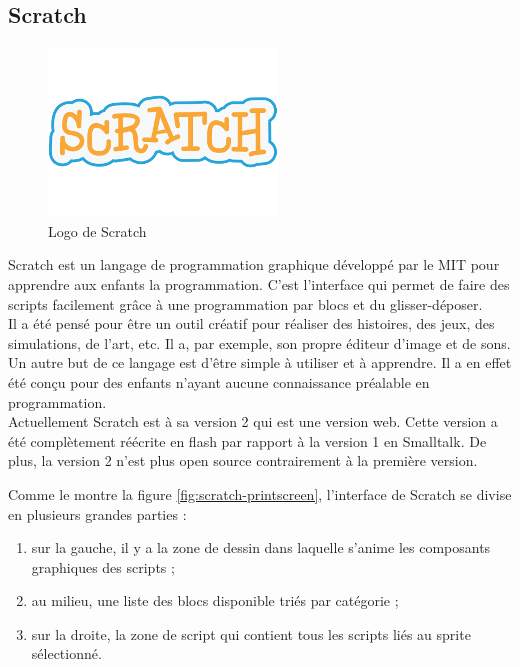 \subsection{Scratch}

\begin{figure}[!ht]
  \begin{center}
    \includegraphics[scale=0.4]{content/5-related_work/images/scratch}
    \caption{Logo de Scratch}
    \label{fig:scratch}
  \end{center}
\end{figure}
Scratch \cite{scratch} est un langage de programmation graphique développé par le MIT pour apprendre aux enfants la programmation. C'est l'interface qui permet de faire des scripts facilement grâce à une programmation par \glspl{bloc} et du glisser-déposer.\\

Il a été pensé pour être un outil créatif pour réaliser des histoires, des jeux, des simulations, de l'art, etc. Il a, par exemple, son propre éditeur d'image et de sons. Un autre but de ce langage est d'être simple à utiliser et à apprendre. Il a en effet été conçu pour des enfants n'ayant aucune connaissance préalable en programmation.\\

Actuellement Scratch est à sa version 2 qui est une version web. Cette version a été complètement réécrite en flash par rapport à la version 1 en Smalltalk. De plus, la version 2 n'est plus open source contrairement à la première version.

Comme le montre la figure \ref{fig:scratch-printscreen}, l'interface de Scratch se divise en plusieurs grandes parties :

\begin{enumerate}
\item sur la gauche, il y a la zone de dessin dans laquelle s'anime les composants graphiques des scripts ;
\item au milieu, une liste des \glspl{bloc} disponible triés par catégorie ;
\item sur la droite, la zone de script qui contient tous les scripts liés au sprite sélectionné.
\end{enumerate}

